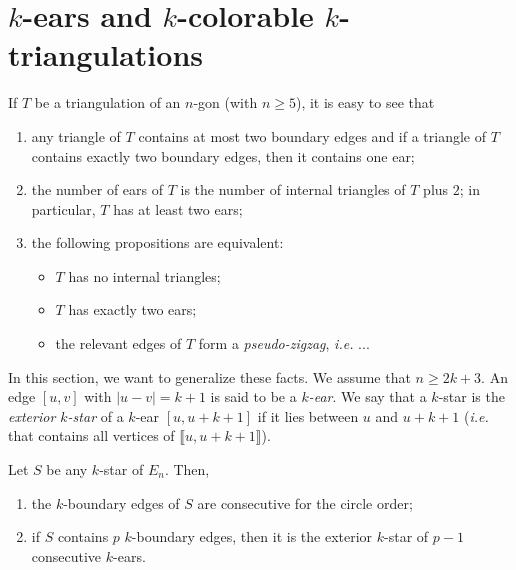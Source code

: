 \documentclass[12pt]{amsart}
\begin{document}


\section{$k$-ears and $k$-colorable $k$-triangulations}\label{sectionears}

If $T$ be a triangulation of an $n$-gon (with $n\ge 5$), it is easy to see that
\begin{enumerate}
\item any triangle of $T$ contains at most two boundary edges and if a triangle of $T$ contains exactly two boundary edges, then it contains one ear; 
\item the number of ears of $T$ is the number of internal triangles of $T$ plus $2$; in particular, $T$ has at least two ears;
\item the following propositions are equivalent:
\begin{itemize}
\item $T$ has no internal triangles;
\item $T$ has exactly two ears;
\item the relevant edges of $T$ form a \emph{pseudo-zigzag}, {\it i.e.} ...
\end{itemize}
\end{enumerate}

In this section, we want to generalize these facts. We assume that $n\ge 2k+3$. An edge $[u,v]$ with $|u-v|=k+1$ is said to be a \emph{$k$-ear}. We say that a $k$-star is the \emph{exterior $k$-star} of a $k$-ear $[u,u+k+1]$ if it lies between $u$ and $u+k+1$ ({\it i.e.} that contains all vertices of $\llbracket u,u+k+1\rrbracket$).

\begin{lemma}\label{consectivboundary}
Let $S$ be any $k$-star of $E_n$. Then, 
\begin{enumerate}
\item the $k$-boundary edges of $S$ are consecutive for the circle order;
\item if $S$ contains $p$ $k$-boundary edges, then it is the exterior $k$-star of $p-1$ consecutive $k$-ears.
\end{enumerate}
\end{lemma}
\end{document}
